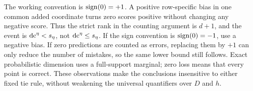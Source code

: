 The working convention is $\operatorname{sign}(0)=+1$. A positive row-specific bias in one common added coordinate turns zero scores positive without changing any negative score. Thus the strict rank in the counting argument is $d+1$, and the event is $\operatorname{dc}^\eta<s_\eta$, not $\operatorname{dc}^\eta\le s_\eta$. If the sign convention is $\operatorname{sign}(0)=-1$, use a negative bias. If zero predictions are counted as errors, replacing them by $+1$ can only reduce the number of mistakes, so the same lower bound still follows. Exact probabilistic dimension uses a full-support marginal; zero loss means that every point is correct. These observations make the conclusions insensitive to either fixed tie rule, without weakening the universal quantifiers over $D$ and $h$.
